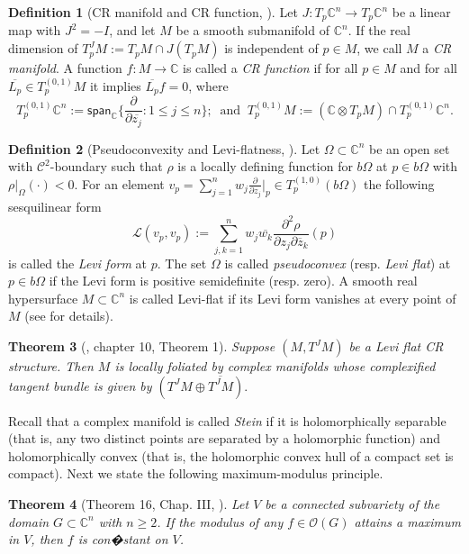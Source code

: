 \documentclass[12pt,reqno, a4paper]{amsart}
\newtheorem{theorem}{Theorem}[section]
\theoremstyle{definition}
\theoremstyle{definition}
\newtheorem{definition}[theorem]{Definition}
\numberwithin{equation}{section}
\def\C{\mathbb{C}}                              %
\begin{document}
\begin{definition}[CR manifold and CR function, \cite{bogg}]
	Let ${J :T_p \C^n \to T_p \C^n}$ be a linear map with $J^2=-I$, and let $M$ be a smooth submanifold of $\C^n$. If the real dimension of  $T_p^JM :=T_pM \cap J(T_pM)$ is independent of $p\in M$, we call $M$ a \textit{CR manifold}. A function $f:M\to \C$ is called a \textit{CR function} if for all $p\in M$ and for all $\overline{L_p}\in T_p^{(0,1)}M$ it implies $\overline{L_p}f=0$, where
	$$T_p^{(0,1)}\C^n:= \textsf{span}_{\C}\big\{\frac{\partial}{\partial \overline{z_j}}:1\leq j\leq n\big\};~ \text{ and }~ T_p^{(0,1)}M:= (\C \otimes T_pM)\cap T_p^{(0,1)}\C^n. $$
\end{definition}


\begin{definition}[Pseudoconvexity and Levi-flatness, \cite{kra}]
Let $\Omega\subset \C^n$ be an open set with $\mathcal{C}^2$-boundary such that $\rho$ is a locally defining function for $b\Omega$ at $p\in b\Omega$ with $\rho|_{\Omega}(\cdot)<0$. For an element $v_p=\sum_{j =1}^{n} w_j \frac{\partial}{\partial z_j}\Big\rvert_p \in T_{p}^{(1,0)}(b\Omega)$ the following sesquilinear form $$\mathcal{L}(v_p, v_p):=\sum \limits_{j,k =1}^{n} {w_j}\overline{w_k} \frac{\partial^2\rho}{\partial {z_j}\partial \overline{z}_k} (p)$$ is called the \textit{Levi form} at $p.$ The set $ \Omega$ is called  \textit{pseudoconvex} (resp. \textit{Levi flat}) at $p\in b\Omega$ if the Levi form is positive semidefinite (resp. zero). A smooth real hypersurface $M\subset \C^n$ is called Levi-flat if its Levi form vanishes at every point of $M$ (see \cite{bogg} for details). 
\end{definition}


\begin{theorem}[\cite{bogg}, chapter 10, Theorem 1]\label{foli}
	Suppose $(M,T^JM)$ be a Levi flat CR structure. Then $M$ is locally foliated by complex manifolds whose complexified tangent bundle is given by $(T^JM\oplus \overline{T^JM}).$
\end{theorem}

Recall that a complex manifold is called \textit{Stein} if it is holomorphically separable (that is, any two distinct points are separated by a holomorphic function) and holomorphically convex (that is, the holomorphic convex hull of a compact set is compact). Next we state the following maximum-modulus principle.

\begin{theorem}[Theorem 16, Chap. III, \cite{gun-ros}]\label{gun-ross}
Let $V$ be a connected subvariety of the domain $G\subset \C^n$ with $n\geq 2$. If the modulus of any $f\in \mathcal{O}(G)$ attains a maximum in $V$, then $f$ is con�stant on $V$.	
\end{theorem}
\end{document}

